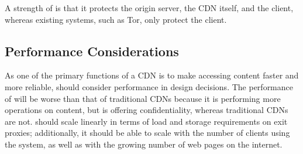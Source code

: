 


A strength of \system{} is that it protects the origin server, the CDN itself, and the client, whereas 
existing systems, such as Tor, only protect the client.

\subsection{Performance Considerations}
As one of the primary functions of a CDN is to make accessing content faster and more 
reliable, \system{} should consider performance in design decisions.  The performance of \system{} will 
be worse than that of traditional CDNs because it is performing more operations on content, but \system{} 
is offering confidentiality, whereas traditional CDNs are not.  \system{} should scale linearly in terms of load 
and storage requirements on exit proxies; additionally, it should be able to 
scale with the number of clients using the system, as well as with the growing number of web pages on the internet.
